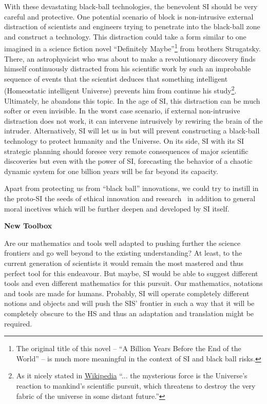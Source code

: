 \documentclass[a4paper,11pt]{article}
\begin{document}
With these devastating black-ball technologies, the benevolent SI should be very careful and protective. One potential scenario of block is non-intrusive external distraction of scientists and engineers trying to penetrate into the black-ball zone and construct a technology. This distraction could take a form similar to one imagined in a science fiction novel ``Definitely Maybe''\footnote{The original title of this novel -- ``A Billion Years Before the End of the World'' -- is much more meaningful in the context of SI and black ball risks.} from brothers Strugatsky. There, an astrophysicist who was about to make a revolutionary discovery finds himself continuously distracted from his scientific work by such an improbable sequence of events that the scientist deduces that something intelligent (Homeostatic intelligent Universe) prevents him from continue his study\footnote{As it nicely stated in \href{https://en.wikipedia.org/wiki/Definitely_Maybe_(novel)}{Wikipedia} ``... the mysterious force is the Universe's reaction to mankind's scientific pursuit, which threatens to destroy the very fabric of the universe in some distant future.''}. Ultimately, he abandons this topic. In the age of SI, this distraction can be much softer or even invisible. In the worst case scenario, if external non-intrusive distraction does not work, it can intervene intrusively by rewiring the brain of the intruder. Alternatively, SI will let us in but will prevent constructing a black-ball technology to protect humanity and the Universe. On its side, SI with its SI strategic planning should foresee very remote consequences of major scientific discoveries but even with the power of SI, forecasting the behavior of a chaotic dynamic system for one billion years will be far beyond its capacity.

Apart from protecting us from ``black ball'' innovations, we could try to instill in the proto-SI the seeds of ethical innovation and research~\parencite{grinbaum2013responsible,grinbaum2024responsible} in addition to general moral incetives which will be further deepen and developed by SI itself.


\textbf{New Toolbox}

Are our mathematics and tools well adapted to pushing further the science frontiers and go well beyond to the existing understanding? At least, to the current generation of scientists it would remain the most mastered and thus perfect tool for this endeavour. But maybe, SI would be able to suggest different tools and even different mathematics for this pursuit. Our mathematics, notations and tools are made for humans. Probably, SI will operate completely different notions and objects and will push the SIS' frontier in such a way that it will be completely obscure to the HS and thus an adaptation and translation might be required.
\end{document}
